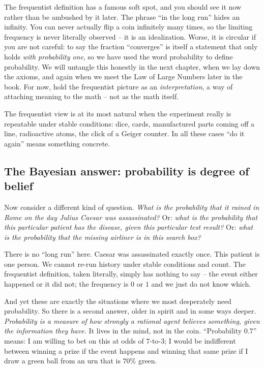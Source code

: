 \begin{trapbox}
The frequentist definition has a famous soft spot, and you should see it now
rather than be ambushed by it later. The phrase ``in the long run'' hides an
infinity. You can never actually flip a coin infinitely many times, so the
limiting frequency is never literally observed -- it is an idealization. Worse, it
is circular if you are not careful: to say the fraction ``converges'' is itself a
statement that only holds \emph{with probability one}, so we have used the word
probability to define probability. We will untangle this honestly in the next
chapter, when we lay down the axioms, and again when we meet the Law of Large
Numbers later in the book. For now, hold the frequentist picture as an
\emph{interpretation}, a way
of attaching meaning to the math -- not as the math itself.
\end{trapbox}

The frequentist view is at its most natural when the experiment really is
repeatable under stable conditions: dice, cards, manufactured parts coming off a
line, radioactive atoms, the click of a Geiger counter. In all these cases ``do it
again'' means something concrete.

\subsection{The Bayesian answer: probability is degree of belief}
\label{ch01:bayesian}

Now consider a different kind of question. \emph{What is the probability that it
rained in Rome on the day Julius Caesar was assassinated?} Or: \emph{what is the
probability that this particular patient has the disease, given this particular
test result?} Or: \emph{what is the probability that the missing airliner is in
this search box?}

There is no ``long run'' here. Caesar was assassinated exactly once. This patient
is one person. We cannot re-run history under stable conditions and count. The
frequentist definition, taken literally, simply has nothing to say -- the event
either happened or it did not; the frequency is $0$ or $1$ and we just do not know
which.

And yet these are exactly the situations where we most desperately need
probability. So there is a second answer, older in spirit and in some ways deeper.
\emph{Probability is a measure of how strongly a rational agent believes
something, given the information they have.} It lives in the mind, not in the
coin. ``Probability $0.7$'' means: I am willing to bet on this at odds of
$7$-to-$3$; I would be indifferent between winning a prize if the event happens
and winning that same prize if I draw a green ball from an urn that is $70\%$
green.

